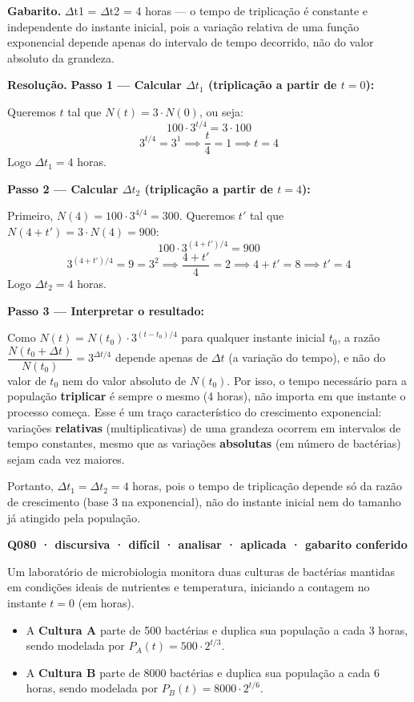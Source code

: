 \documentclass[11pt,a4paper]{article}
\begin{document}
\textbf{Gabarito.} $\Delta$t1 = $\Delta$t2 = 4 horas — o tempo de triplicação é constante e independente do instante inicial, pois a variação relativa de uma função exponencial depende apenas do intervalo de tempo decorrido, não do valor absoluto da grandeza.

\textbf{Resolução.} \textbf{Passo 1 — Calcular $\Delta t_1$ (triplicação a partir de $t=0$):}

Queremos $t$ tal que $N(t) = 3\cdot N(0)$, ou seja:
$$100\cdot 3^{t/4} = 3\cdot 100$$
$$3^{t/4} = 3^1 \implies \frac{t}{4}=1 \implies t = 4$$
Logo $\Delta t_1 = 4$ horas.

\textbf{Passo 2 — Calcular $\Delta t_2$ (triplicação a partir de $t=4$):}

Primeiro, $N(4) = 100\cdot 3^{4/4} = 300$. Queremos $t'$ tal que $N(4+t') = 3\cdot N(4) = 900$:
$$100\cdot 3^{(4+t')/4} = 900$$
$$3^{(4+t')/4} = 9 = 3^2 \implies \frac{4+t'}{4} = 2 \implies 4+t' = 8 \implies t' = 4$$
Logo $\Delta t_2 = 4$ horas.

\textbf{Passo 3 — Interpretar o resultado:}

Como $N(t) = N(t_0)\cdot 3^{(t-t_0)/4}$ para qualquer instante inicial $t_0$, a razão $\dfrac{N(t_0+\Delta t)}{N(t_0)} = 3^{\Delta t/4}$ depende apenas de $\Delta t$ (a variação do tempo), e não do valor de $t_0$ nem do valor absoluto de $N(t_0)$. Por isso, o tempo necessário para a população \textbf{triplicar} é sempre o mesmo (4 horas), não importa em que instante o processo começa. Esse é um traço característico do crescimento exponencial: variações \textbf{relativas} (multiplicativas) de uma grandeza ocorrem em intervalos de tempo constantes, mesmo que as variações \textbf{absolutas} (em número de bactérias) sejam cada vez maiores.

Portanto, $\Delta t_1 = \Delta t_2 = 4$ horas, pois o tempo de triplicação depende só da razão de crescimento (base 3 na exponencial), não do instante inicial nem do tamanho já atingido pela população.

\bigskip\noindent\textbf{Q080 · discursiva · difícil · analisar · aplicada · gabarito conferido}\par\nopagebreak
Um laboratório de microbiologia monitora duas culturas de bactérias mantidas em condições ideais de nutrientes e temperatura, iniciando a contagem no instante $t=0$ (em horas).

\begin{itemize}[nosep,leftmargin=*]
\item A \textbf{Cultura A} parte de 500 bactérias e duplica sua população a cada 3 horas, sendo modelada por $P_A(t) = 500 \cdot 2^{t/3}$.
\item A \textbf{Cultura B} parte de 8000 bactérias e duplica sua população a cada 6 horas, sendo modelada por $P_B(t) = 8000 \cdot 2^{t/6}$.
\end{itemize}
\end{document}
